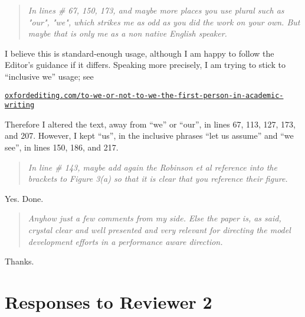 \documentclass[letterpaper,final,12pt,reqno]{amsart}
\newenvironment{review}%
{\bigskip \par \begin{quote} \selectfont \sl}%
{\end{quote}}
\begin{document}
\begin{review}
In lines \# 67, 150, 173, and maybe more places you use plural such as "our", "we", which strikes me as odd as you did the work on your own. But maybe that is only me as a non native English speaker.
\end{review}

\noindent I believe this is standard-enough usage, although I am happy to follow the Editor's guidance if it differs.  Speaking more precisely, I am trying to stick to ``inclusive we'' usage; see

\medskip
{\footnotesize \href{https://oxfordediting.com/to-we-or-not-to-we-the-first-person-in-academic-writing/}{\texttt{oxfordediting.com/to-we-or-not-to-we-the-first-person-in-academic-writing}}}

\medskip
\noindent Therefore I altered the text, away from ``we'' or ``our'', in lines 67, 113, 127, 173, and 207.  However, I kept ``us'', in the inclusive phrases ``let us assume'' and ``we see'', in lines 150, 186, and 217.

\begin{review}
In line \# 143, maybe add again the Robinson et al reference into the brackets to Figure 3(a) so that it is clear that you reference their figure.
\end{review}

\noindent Yes.  Done.

\begin{review}
Anyhow just a few comments from my side. Else the paper is, as said, crystal clear and well presented and very relevant for directing the model development efforts in a performance aware direction.
\end{review}

\noindent Thanks.


\section{Responses to Reviewer 2}
\end{document}
